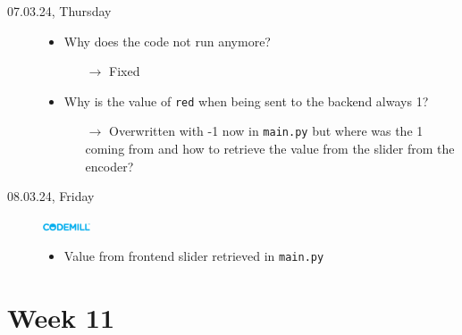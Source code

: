\documentclass[a4, 11pt]{scrartcl}
\begin{document}
\begin{description}
\item[07.03.24, Thursday]
\begin{itemize}
	\item[]
	\item Why does the code not run anymore?
	\begin{itemize}
		\item[$\rightarrow$] Fixed
	\end{itemize}
	\item Why is the value of \texttt{red} when being sent to the backend always 1?
		\begin{itemize}
		\item[$\rightarrow$] Overwritten with -1 now in \texttt{main.py} but where was the 1 coming from and how to retrieve the value from the slider from the encoder?
	\end{itemize}

\end{itemize}











\item[08.03.24, Friday]
\includegraphics[width=1.4cm]{codemill.png}
\begin{itemize}
	\item Value from frontend slider retrieved in \texttt{main.py}
\end{itemize}



	
	
\end{description}	















\newpage
\section*{Week 11}	
\end{document}
